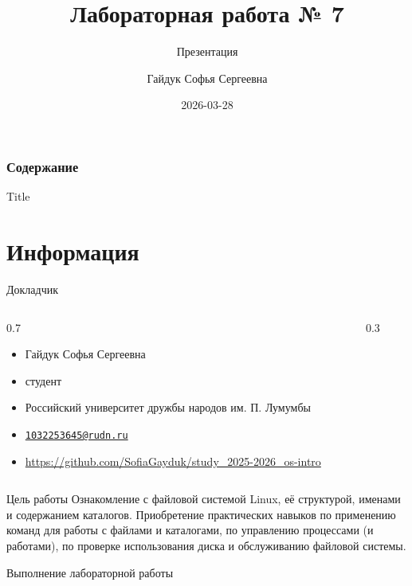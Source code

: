 \documentclass[
  ignorenonframetext,
  aspectratio=169,
]{beamer}
\title{Лабораторная работа № 7}
\subtitle{Презентация}
\author{Гайдук Софья Сергеевна}
\date{2026-03-28}
\providecommand{\tightlist}{%
  \setlength{\itemsep}{0pt}\setlength{\parskip}{0pt}}\usepackage{longtable,booktabs,array}
\renewcommand*\contentsname{Table of contents}
\newcommand\contentsname{Table of contents}
\begin{document}
\frame{\titlepage}

\renewcommand*\contentsname{Содержание}
\begin{frame}[allowframebreaks]
  \frametitle{Содержание}
  \setcounter{tocdepth}{1}
  \tableofcontents
\end{frame}

\begin{frame}{Title}
\label{title}
\end{frame}

\section{Информация}\label{ux438ux43dux444ux43eux440ux43cux430ux446ux438ux44f}

\begin{frame}{Докладчик}
\label{ux434ux43eux43aux43bux430ux434ux447ux438ux43a}
\begin{columns}[c]
\begin{column}{0.7\linewidth}
\begin{itemize}[<+->]
\tightlist
\item
  Гайдук Софья Сергеевна
\item
  студент
\item
  Российский университет дружбы народов им. П. Лумумбы
\item
  \href{mailto:1032253645@rudn.ru}{\nolinkurl{1032253645@rudn.ru}}
\item
  \url{https://github.com/SofiaGayduk/study_2025-2026_os-intro}
\end{itemize}
\end{column}

\begin{column}{0.3\linewidth}
\end{column}
\end{columns}
\end{frame}

\begin{frame}{Цель работы}
\label{ux446ux435ux43bux44c-ux440ux430ux431ux43eux442ux44b}
Ознакомление с файловой системой Linux, её структурой, именами и
содержанием каталогов. Приобретение практических навыков по применению
команд для работы с файлами и каталогами, по управлению процессами (и
работами), по проверке использования диска и обслуживанию файловой
системы.
\end{frame}

\begin{frame}{Выполнение лабораторной работы}
\label{ux432ux44bux43fux43eux43bux43dux435ux43dux438ux435-ux43bux430ux431ux43eux440ux430ux442ux43eux440ux43dux43eux439-ux440ux430ux431ux43eux442ux44b}
\end{frame}
\end{document}
